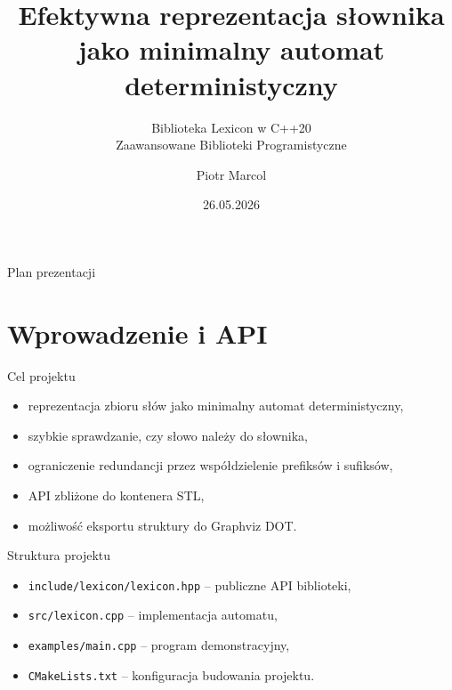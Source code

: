 \documentclass{beamer}
\title[Efektywna reprezentacja słownika]{Efektywna reprezentacja słownika jako minimalny automat deterministyczny}
\subtitle{Biblioteka Lexicon w C++20\\Zaawansowane Biblioteki Programistyczne}
\author{Piotr Marcol}
\date{26.05.2026}
\begin{document}
\frame{\titlepage}

\begin{frame}{Plan prezentacji}
    \tableofcontents
\end{frame}

\section{Wprowadzenie i API}

\begin{frame}{Cel projektu}
    \begin{itemize}
        \item reprezentacja zbioru słów jako minimalny automat deterministyczny,
        \item szybkie sprawdzanie, czy słowo należy do słownika,
        \item ograniczenie redundancji przez współdzielenie prefiksów i sufiksów,
        \item API zbliżone do kontenera STL,
        \item możliwość eksportu struktury do Graphviz DOT.
    \end{itemize}
\end{frame}


\begin{frame}{Struktura projektu}
    \begin{itemize}
        \item \texttt{include/lexicon/lexicon.hpp} -- publiczne API biblioteki,
        \item \texttt{src/lexicon.cpp} -- implementacja automatu,
        \item \texttt{examples/main.cpp} -- program demonstracyjny,
        \item \texttt{CMakeLists.txt} -- konfiguracja budowania projektu.
    \end{itemize}
\end{frame}
\end{document}
